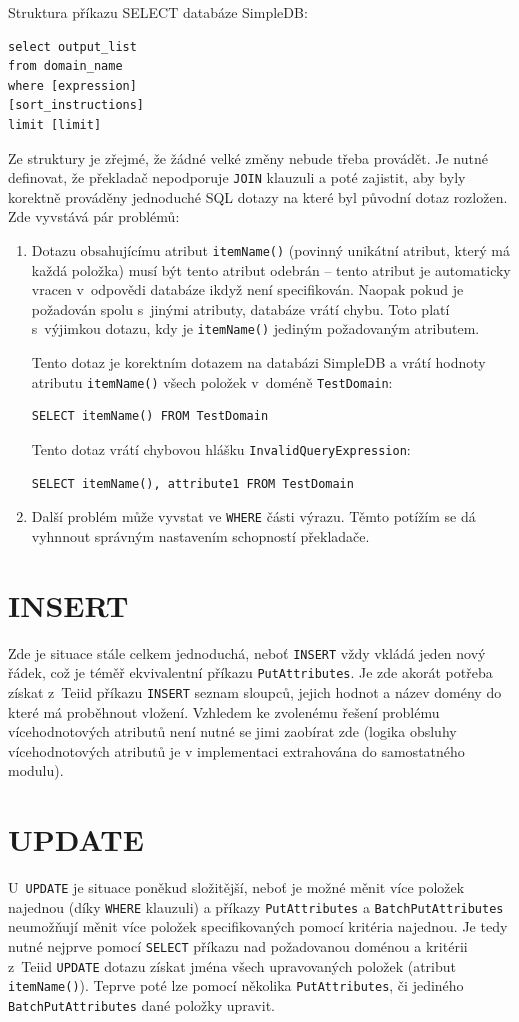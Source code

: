 \documentclass[oneside,12pt]{fithesis2}
\begin{document}
Struktura příkazu SELECT databáze SimpleDB:
\begin{Verbatim}[frame=leftline,fontsize=\small]
select output_list
from domain_name
where [expression]
[sort_instructions]
limit [limit] 
\end{Verbatim}
Ze struktury je zřejmé, že žádné velké změny nebude třeba provádět. Je nutné definovat, že překladač nepodporuje \verb<JOIN< klauzuli a poté zajistit, aby byly korektně prováděny jednoduché SQL dotazy na které byl původní dotaz rozložen. Zde vyvstává pár problémů:
\begin{enumerate}
 \item Dotazu obsahujícímu atribut \verb<itemName()< (povinný unikátní atribut, který má každá položka) musí být tento atribut odebrán -- tento atribut je automaticky vracen v~odpovědi databáze ikdyž není specifikován. Naopak pokud je požadován spolu s~jinými atributy, databáze vrátí chybu. Toto platí s~výjimkou dotazu, kdy je \verb<itemName()< jediným požadovaným atributem.
 
 Tento dotaz je korektním dotazem na databázi SimpleDB a vrátí hodnoty atributu \verb<itemName()< všech položek v~doméně \verb<TestDomain<:
 \begin{Verbatim}[fontsize=\small]
SELECT itemName() FROM TestDomain
  \end{Verbatim}
 Tento dotaz vrátí chybovou hlášku \verb<InvalidQueryExpression<:
  \begin{Verbatim}[fontsize=\small]
SELECT itemName(), attribute1 FROM TestDomain
  \end{Verbatim}
 \item Další problém může vyvstat ve \texttt{WHERE} části výrazu. Těmto potížím se dá vyhnnout správným nastavením schopností překladače. 
\end{enumerate}

\section{INSERT}
Zde je situace stále celkem jednoduchá, neboť \verb<INSERT< vždy vkládá jeden nový řádek, což je téměř ekvivalentní příkazu \verb<PutAttributes<. Je zde akorát potřeba získat z~Teiid příkazu \verb<INSERT< seznam sloupců, jejich hodnot a název domény do které má proběhnout vložení. Vzhledem ke zvolenému řešení problému vícehodnotových atributů není nutné se jimi zaobírat zde (logika obsluhy vícehodnotových atributů je v implementaci extrahována do samostatného modulu).
\section{UPDATE}
U~\verb<UPDATE< je situace poněkud složitější, neboť je možné měnit více položek najednou (díky \verb<WHERE< klauzuli) a příkazy \verb<PutAttributes< a \verb<BatchPutAttributes< neumožňují měnit více položek specifikovaných pomocí kritéria najednou. Je tedy nutné nejprve pomocí \verb<SELECT< příkazu nad požadovanou doménou a kritérii z~Teiid \verb<UPDATE< dotazu získat jména všech upravovaných položek (atribut \verb<itemName()<). Teprve poté lze pomocí několika \verb<PutAttributes<, či jediného \verb<BatchPutAttributes< dané položky upravit.
\end{document}
